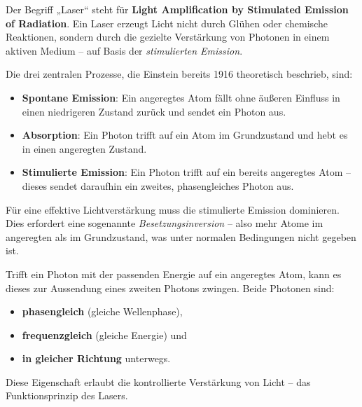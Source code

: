 Der Begriff „Laser“ steht für \textbf{Light Amplification by Stimulated Emission of Radiation}. Ein Laser erzeugt Licht nicht durch Glühen oder chemische Reaktionen, sondern durch die gezielte Verstärkung von Photonen in einem aktiven Medium – auf Basis der \emph{stimulierten Emission}.

Die drei zentralen Prozesse, die Einstein bereits 1916 theoretisch beschrieb, sind:

\begin{itemize}
	\item \textbf{Spontane Emission}: Ein angeregtes Atom fällt ohne äußeren Einfluss in einen niedrigeren Zustand zurück und sendet ein Photon aus.
	\item \textbf{Absorption}: Ein Photon trifft auf ein Atom im Grundzustand und hebt es in einen angeregten Zustand.
	\item \textbf{Stimulierte Emission}: Ein Photon trifft auf ein bereits angeregtes Atom – dieses sendet daraufhin ein zweites, phasengleiches Photon aus.
\end{itemize}

Für eine effektive Lichtverstärkung muss die stimulierte Emission dominieren. Dies erfordert eine sogenannte \emph{Besetzungsinversion} – also mehr Atome im angeregten als im Grundzustand, was unter normalen Bedingungen nicht gegeben ist.

\medskip
\begin{tcolorbox}[physikbox, title={Stimulierte Emission als Grundlage des Lasers}]
	\label{box:grundlagedeslaser}
	Trifft ein Photon mit der passenden Energie auf ein angeregtes Atom, kann es dieses zur Aussendung eines zweiten Photons zwingen. Beide Photonen sind:
	\begin{itemize}
		\item \textbf{phasengleich} (gleiche Wellenphase),
		\item \textbf{frequenzgleich} (gleiche Energie) und
		\item \textbf{in gleicher Richtung} unterwegs.
	\end{itemize}
	Diese Eigenschaft erlaubt die kontrollierte Verstärkung von Licht – das Funktionsprinzip des Lasers.
\end{tcolorbox}

